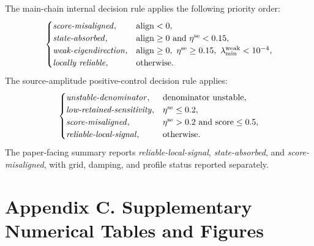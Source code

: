 \documentclass[preprint,12pt]{elsarticle}
\newcommand{\etalow}{\eta^{\rm se}}
\newcommand{\classlabel}[1]{\textnormal{\emph{#1}}}
\begin{document}
The main-chain internal decision rule applies the following priority order:
\begin{equation}
\begin{cases}
\classlabel{score-misaligned}, & \mathrm{align}<0,\\
\classlabel{state-absorbed}, & \mathrm{align}\ge0\ \mathrm{and}\ \etalow<0.15,\\
\classlabel{weak-eigendirection}, & \mathrm{align}\ge0,\ \etalow\ge0.15,\ \lambda_{\min}^{\rm weak}<10^{-4},\\
\classlabel{locally reliable}, & \mathrm{otherwise}.
\end{cases}
\end{equation}
The source-amplitude positive-control decision rule applies:
\begin{equation}
\begin{cases}
\classlabel{unstable-denominator}, & \mathrm{denominator\ unstable},\\
\classlabel{low-retained-sensitivity}, & \etalow\le0.2,\\
\classlabel{score-misaligned}, & \etalow>0.2\ \mathrm{and}\ \mathrm{score}\le0.5,\\
\classlabel{reliable-local-signal}, & \mathrm{otherwise}.
\end{cases}
\end{equation}
The paper-facing summary reports \classlabel{reliable-local-signal}, \classlabel{state-absorbed}, and \classlabel{score-misaligned}, with grid, damping, and profile status reported separately.

\section*{Appendix C. Supplementary Numerical Tables and Figures}
\end{document}
